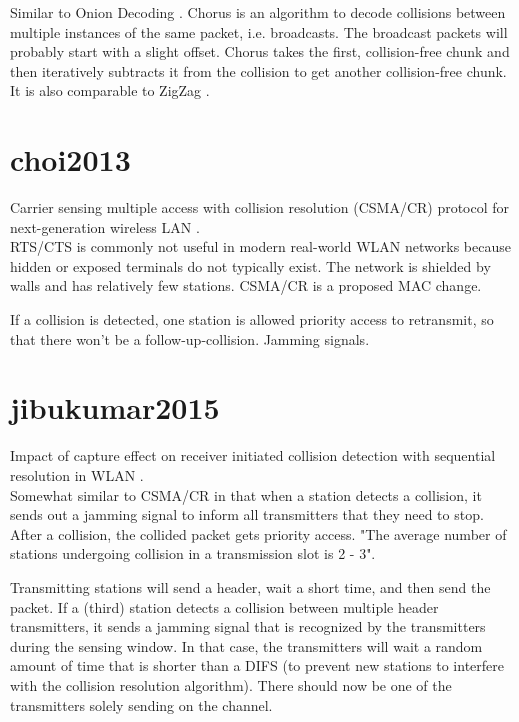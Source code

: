 Similar to Onion Decoding \cite{wang2010}. Chorus is an algorithm to decode collisions between multiple instances of the same packet, i.e. broadcasts. The broadcast packets will probably start with a slight offset. Chorus takes the first, collision-free chunk and then iteratively subtracts it from the collision to get another collision-free chunk. It is also comparable to ZigZag \cite{gollakota2008}.



\section{choi2013}

Carrier sensing multiple access with collision resolution (CSMA/CR) protocol for next-generation wireless LAN \cite{choi2013}.\\

RTS/CTS is commonly not useful in modern real-world WLAN networks because hidden or exposed terminals do not typically exist. The network is shielded by walls and has relatively few stations. CSMA/CR is a proposed MAC change.

If a collision is detected, one station is allowed priority access to retransmit, so that there won't be a follow-up-collision. Jamming signals.



\section{jibukumar2015}

Impact of capture effect on receiver initiated collision detection with sequential resolution in WLAN \cite{jibukumar2015}.\\

Somewhat similar to CSMA/CR in that when a station detects a collision, it sends out a jamming signal to inform all transmitters that they need to stop. After a collision, the collided packet gets priority access. "The average number of stations undergoing collision in a transmission slot is 2 - 3".

Transmitting stations will send a header, wait a short time, and then send the packet. If a (third) station detects a collision between multiple header transmitters, it sends a jamming signal that is recognized by the transmitters during the sensing window. In that case, the transmitters will wait a random amount of time that is shorter than a DIFS (to prevent new stations to interfere with the collision resolution algorithm). There should now be one of the transmitters solely sending on the channel.

